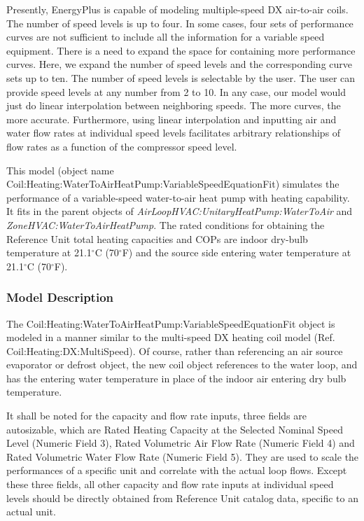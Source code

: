 Presently, EnergyPlus is capable of modeling multiple-speed DX air-to-air coils. The number of speed levels is up to four. In some cases, four sets of performance curves are not sufficient to include all the information for a variable speed equipment. There is a need to expand the space for containing more performance curves. Here, we expand the number of speed levels and the corresponding curve sets up to ten. The number of speed levels is selectable by the user. The user can provide speed levels at any number from 2 to 10. In any case, our model would just do linear interpolation between neighboring speeds. The more curves, the more accurate. Furthermore, using linear interpolation and inputting air and water flow rates at individual speed levels facilitates arbitrary relationships of flow rates as a function of the compressor speed level.

This model (object name Coil:Heating:WaterToAirHeatPump:VariableSpeedEquationFit) simulates the performance of a variable-speed water-to-air heat pump with heating capability. It fits in the parent objects of \emph{AirLoopHVAC:UnitaryHeatPump:WaterToAir} and \emph{ZoneHVAC:WaterToAirHeatPump}. The rated conditions for obtaining the Reference Unit total heating capacities and COPs are indoor dry-bulb temperature at 21.1\(^{\circ}\)C (70\(^{\circ}\)F) and the source side entering water temperature at 21.1\(^{\circ}\)C (70\(^{\circ}\)F).

\subsubsection{Model Description}\label{model-description-10}

The Coil:Heating:WaterToAirHeatPump:VariableSpeedEquationFit object is modeled in a manner similar to the multi-speed DX heating coil model (Ref. Coil:Heating:DX:MultiSpeed). Of course, rather than referencing an air source evaporator or defrost object, the new coil object references to the water loop, and has the entering water temperature in place of the indoor air entering dry bulb temperature.

It shall be noted for the capacity and flow rate inputs, three fields are autosizable, which are Rated Heating Capacity at the Selected Nominal Speed Level (Numeric Field 3), Rated Volumetric Air Flow Rate (Numeric Field 4) and Rated Volumetric Water Flow Rate (Numeric Field 5). They are used to scale the performances of a specific unit and correlate with the actual loop flows. Except these three fields, all other capacity and flow rate inputs at individual speed levels should be directly obtained from Reference Unit catalog data, specific to an actual unit.

